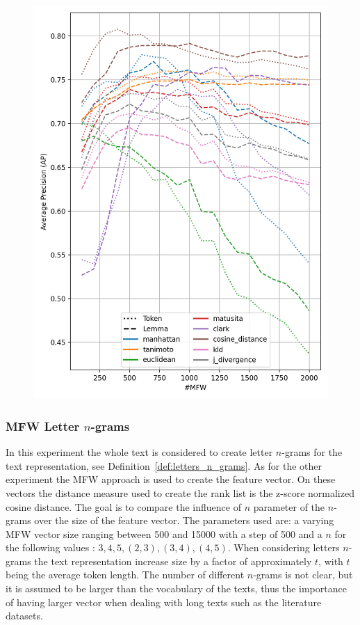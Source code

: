 \begin{figure}
  \label{fig:token_vs_lemma_st_jean}
  \includegraphics[width=0.9\linewidth]{img/token_vs_lemma_st_jean.png}
\end{figure}

\subsubsection{MFW Letter $n$-grams}

In this experiment the whole text is considered to create letter $n$-grams for the text representation, see Definition~\ref{def:letters_n_grams}.
As for the other experiment the MFW approach is used to create the feature vector.
On these vectors the distance measure used to create the rank list is the z-score normalized cosine distance.
The goal is to compare the influence of $n$ parameter of the $n$-grams over the size of the feature vector.
The parameters used are: a varying MFW vector size ranging between 500 and 15000 with a step of 500 and a $n$ for the following values : $3, 4, 5, (2, 3), (3, 4), (4, 5)$.
When considering letters $n$-grams the text representation increase size by a factor of approximately $t$, with $t$ being the average token length.
The number of different $n$-grams is not clear, but it is assumed to be larger than the vocabulary of the texts, thus the importance of having larger vector  when dealing with long texts such as the literature datasets.

